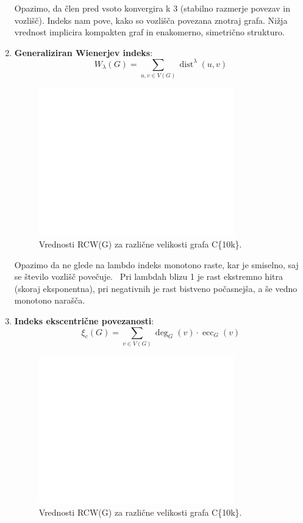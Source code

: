 \documentclass[a4paper, 12pt]{article}
\begin{document}
\begin{enumerate}
    Opazimo, da člen pred vsoto konvergira k 3 (stabilno razmerje povezav in vozlišč). Indeks nam pove, kako so vozlišča povezana znotraj grafa. Nižja vrednost implicira kompakten graf in enakomerno, simetrično strukturo.
    
    \item \textbf{Generaliziran Wienerjev indeks}:
    \[
    W_{\lambda}(G) = \sum_{{u,v} \in V(G)} \operatorname{dist}^{\lambda}(u,v)
    \]
    

    \begin{figure}[h!]
        \centering
        \includegraphics[width=0.8\textwidth]{gw_index_plot.png}
        \caption{Vrednosti RCW(G) za različne velikosti grafa C\{10k\}.}
        \label{fig:rcw}
    \end{figure}

    Opazimo da ne glede na lambdo indeks monotono raste, kar je smiselno, saj se število vozlišč povečuje. \
Pri lambdah blizu 1 je rast ekstremno hitra (skoraj eksponentna), pri negativnih je rast bistveno počasnejša, a še vedno monotono narašča.


    \item \textbf{Indeks ekscentrične povezanosti}:
    \[
    \xi_c(G) = \sum_{v \in V(G)} \deg_G(v) \cdot \operatorname{ecc}_G(v)
    \]
    \begin{figure}[h!]
        \centering
        \includegraphics[width=0.8\textwidth]{ec_index_plot.png}
        \caption{Vrednosti RCW(G) za različne velikosti grafa C\{10k\}.}
        \label{fig:rcw}
    \end{figure}


\end{enumerate}
\end{document}
